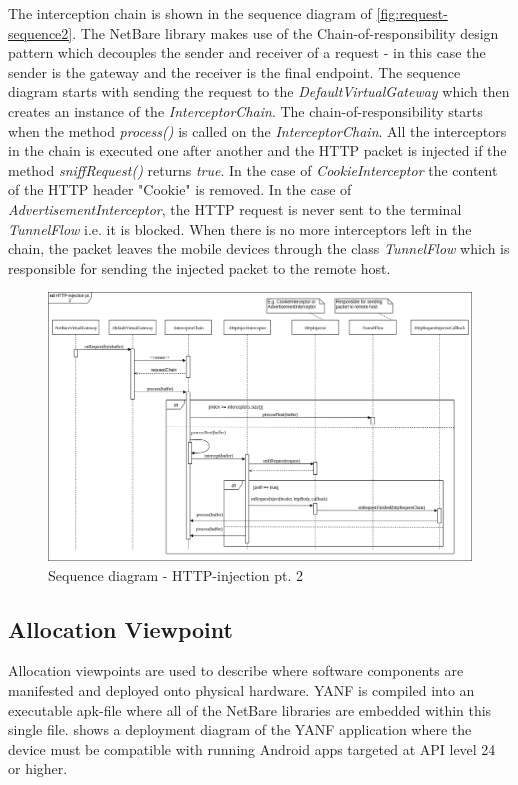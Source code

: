 \documentclass[main.tex]{subfiles}
\begin{document}
The interception chain is shown in the sequence diagram of \autoref{fig:request-sequence2}. The NetBare library makes use of the Chain-of-responsibility design pattern \cite{Gamma1994CreationalPatterns} which decouples the sender and receiver of a request - in this case the sender is the gateway and the receiver is the final endpoint. The sequence diagram starts with sending the request to the \textit{DefaultVirtualGateway} which then creates an instance of the \textit{InterceptorChain}. The chain-of-responsibility starts when the method \textit{process()} is called on the \textit{InterceptorChain}. All the interceptors in the chain is executed one after another and the HTTP packet is injected if the method \textit{sniffRequest()} returns \textit{true}. In the case of \textit{CookieInterceptor} the content of the HTTP header "Cookie" is removed. In the case of \textit{AdvertisementInterceptor}, the HTTP request is never sent to the terminal \textit{TunnelFlow} i.e. it is blocked. When there is no more interceptors left in the chain, the packet leaves the mobile devices through the class \textit{TunnelFlow} which is responsible for sending the injected packet to the remote host.

\begin{figure}[H]
    \centering
    \includegraphics[width=\textwidth]{Images/Diagrams/request-sequence2.png}
    \caption{Sequence diagram - HTTP-injection pt. 2}
    \label{fig:request-sequence2}
\end{figure}


\subsection{Allocation Viewpoint} 
Allocation viewpoints are used to describe where software components are manifested and deployed onto physical hardware. YANF is compiled into an executable apk-file where all of the NetBare libraries are embedded within this single file.   shows a deployment diagram of the YANF application where the device must be compatible with running Android apps targeted at API level 24 or higher.
\end{document}
